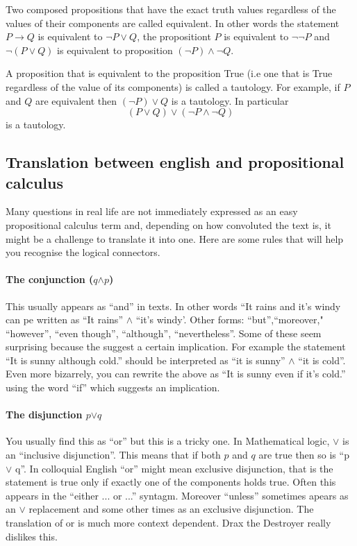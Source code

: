 \begin{itemize}
Two composed propositions that have the exact truth values regardless of the values of their components are called equivalent. In other words the statement $P \rightarrow Q$ is equivalent to $\neg P \lor Q$, the propositiont $P$ is equivalent to  $\neg \neg P$ and  $ \neg ( P \lor Q)$ is equivalent to proposition $(\neg P)\land \neg Q $.

A proposition that is equivalent to the proposition True (i.e one that is True regardless of the value of its components) is called a tautology. For example, if $P$ and $Q$ are equivalent then $(\neg P) \lor Q$ is a tautology. In particular  $$ ( P \lor Q) \lor (\neg P\land \neg Q)$$ is a tautology. 

\subsection{Translation between english and propositional calculus}

Many questions in real life are not immediately expressed as an easy propositional calculus term and, depending on how convoluted the text is, it  might be a challenge to translate it into one.  Here are some rules that will help you recognise the logical connectors.


\paragraph{\bf The conjunction ($q\mathbf{\land}p$)} This usually appears as ``and'' in texts. In other words  ``It rains and it's windy can pe written as ``It rains'' $ \land $ ``it's windy'. Other forms: ``but'',``moreover," ``however'',  ``even though'', ``although'', ``nevertheless''. Some of these seem surprising because the suggest a certain implication. For example the statement ``It is sunny although cold.'' should be interpreted as ``it is sunny'' $\land$
 ``it is cold''. Even more bizarrely, you can rewrite the above as ``It is sunny even if it's cold.'' using the word ``if'' which suggests an implication.
 
 \paragraph{\bf The disjunction \bf$p \mathbf{\lor}q$}You usually find this as ``or'' but this is a tricky one. In Mathematical logic, $\lor$ is an ``inclusive disjunction''. This means that if both $p$ and $q$ are true then so is ``p $\lor$ q''. In colloquial English ``or'' might mean exclusive disjunction, that is the statement is true only if exactly one of the components holds true. Often this appears in the ``either ... or ...'' syntagm. Moreover ``unless'' sometimes apears as an $\lor$ replacement and some other times as an exclusive disjunction. The translation of or is much more context dependent.  Drax the Destroyer really dislikes this.
 

\end{itemize}
